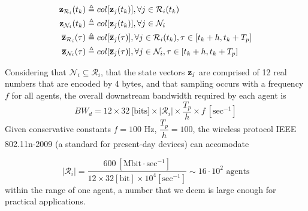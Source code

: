 \begin{align}
  \bm{\mathbf{z}}_{\mathcal{R}_i}(t_k) &\triangleq col[\bm{\mathbf{z}}_j(t_k)], \forall j \in \mathcal{R}_i(t_k) \\
  \bm{\mathbf{z}}_{\mathcal{N}_i}(t_k) &\triangleq col[\bm{\mathbf{z}}_j(t_k)], \forall j \in \mathcal{N}_i \\
  \overline{\bm{\mathbf{z}}}_{\mathcal{R}_i}(\tau) &\triangleq col[\overline{\bm{\mathbf{z}}}_j(\tau)], \forall j \in \mathcal{R}_i(t_k), \tau \in [t_k + h, t_k + T_p] \\
  \overline{\bm{\mathbf{z}}}_{\mathcal{N}_i}(\tau) &\triangleq col[\overline{\bm{\mathbf{z}}}_j(\tau)], \forall j \in \mathcal{N}_i, \tau \in [t_k + h, t_k + T_p]
\end{align}

Considering that $\mathcal{N}_i \subseteq \mathcal{R}_i$, that the state
vectors $\bm{\mathbf{z}}_j$ are comprised of 12 real numbers that are encoded by
4 bytes, and that sampling occurs with a frequency $f$ for all agents, the
overall downstream bandwidth required by each agent is
$$BW_d = 12 \times 32\ \text{[bits]} \times |\mathcal{R}_i| \times \dfrac{T_p}{h} \times f\ [\text{sec}^{-1}]$$
Given conservative constants $f = 100$ Hz, $\dfrac{T_p}{h} = 100$, the
wireless protocol IEEE 802.11n-2009 (a standard for present-day devices)
can accomodate

$$|\mathcal{R}_i| = \dfrac{600\ [\text{Mbit}\cdot \text{sec}^{-1}] }{12\times32[\text{bit}]\times10^4 [\text{sec}^{-1}]} \sim
16 \cdot 10^2 \text{ agents}$$ within the range of one agent, a number that we deem is
large enough for practical applications.
